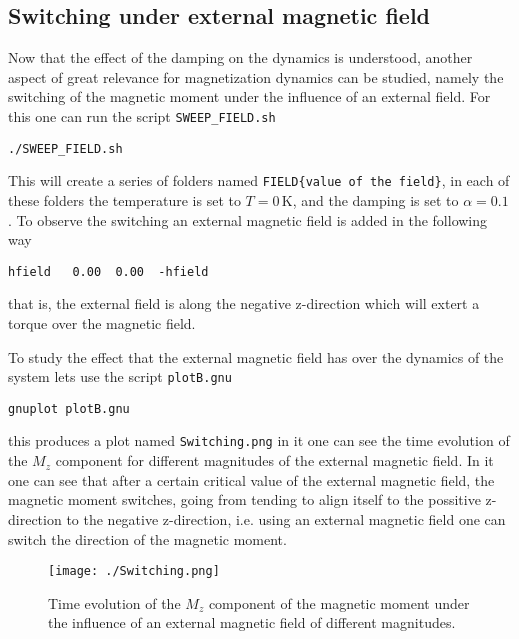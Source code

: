 \documentclass[11pt,fleqn,a4]{book} %
\begin{document}
\subsection{Switching under external magnetic field}

Now that the effect of the damping on the dynamics is understood, another aspect of great relevance for magnetization dynamics can be studied, namely the switching of the magnetic moment under the influence of an external field. For this one can run the script \verb;SWEEP_FIELD.sh;

\begin{fBox} 
\begin{Verbatim}
./SWEEP_FIELD.sh
\end{Verbatim}
\end{fBox}

This will create a series of folders named \verb;FIELD{value of the field};, in each of these folders the temperature is set to $T=0\,\textrm{K}$, and the damping is set to $\alpha=0.1$. To observe the switching an external magnetic field is added in the following way

\begin{fBox} 
\begin{Verbatim}
hfield   0.00  0.00  -hfield
\end{Verbatim}
\end{fBox}

\noindent that is, the external field is along the negative z-direction which will extert a torque over the magnetic field.

To study the effect that the external magnetic field has over the dynamics of the system lets use the script \verb;plotB.gnu;

\begin{fBox} 
\begin{Verbatim}
gnuplot plotB.gnu
\end{Verbatim}
\end{fBox}

\noindent this produces a plot named \verb;Switching.png; in it one can see the time evolution of the $M_z$ component for different magnitudes of the external magnetic field. In it one can see that after a certain critical value of the external magnetic field, the magnetic moment switches, going from tending to align itself to the possitive z-direction to the negative z-direction, i.e. using an external magnetic field one can switch the direction of the magnetic moment. 

\begin{figure}[ht]
\center
\texttt{[image: ./Switching.png]}
\caption{Time evolution of the $M_z$ component of the magnetic moment under the influence of an external magnetic field of different magnitudes.\label{fig:switching}}
\end{figure}
\end{document}
